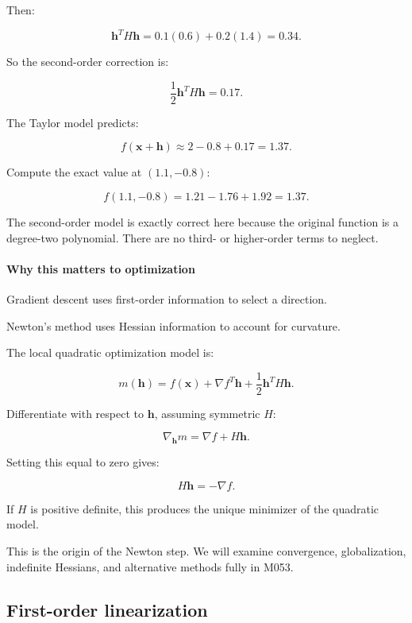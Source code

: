 Then:

\[
\mathbf h^TH\mathbf h = 0.1(0.6)+0.2(1.4) =0.34.
\]

So the second-order correction is:

\[
\frac12\mathbf h^TH\mathbf h=0.17.
\]

The Taylor model predicts:

\[
f(\mathbf x+\mathbf h) \approx2-0.8+0.17=\boxed{1.37}.
\]

Compute the exact value at \((1.1,-0.8)\):

\[
f(1.1,-0.8) =1.21-1.76+1.92 =\boxed{1.37}.
\]

The second-order model is exactly correct here because the original function is a degree-two polynomial. There are no third- or higher-order terms to neglect.

\paragraph{Why this matters to optimization}\label{02-foundations-ii-ch021-why-this-matters-to-optimization}

\hypertarget{02-foundations-ii-ch021-why-this-matters-to-optimization}{}

Gradient descent uses first-order information to select a direction.

Newton's method uses Hessian information to account for curvature.

The local quadratic optimization model is:

\[
m(\mathbf h)= f(\mathbf x)+ \nabla f^T\mathbf h+ \frac12\mathbf h^TH\mathbf h.
\]

Differentiate with respect to \(\mathbf h\), assuming symmetric \(H\):

\[
\nabla_{\mathbf h}m=\nabla f+H\mathbf h.
\]

Setting this equal to zero gives:

\[
\boxed{H\mathbf h=-\nabla f}.
\]

If \(H\) is positive definite, this produces the unique minimizer of the quadratic model.

This is the origin of the Newton step. We will examine convergence, globalization, indefinite Hessians, and alternative methods fully in M053.

\subsection{First-order linearization}\label{02-foundations-ii-ch021-first-order-linearization}

